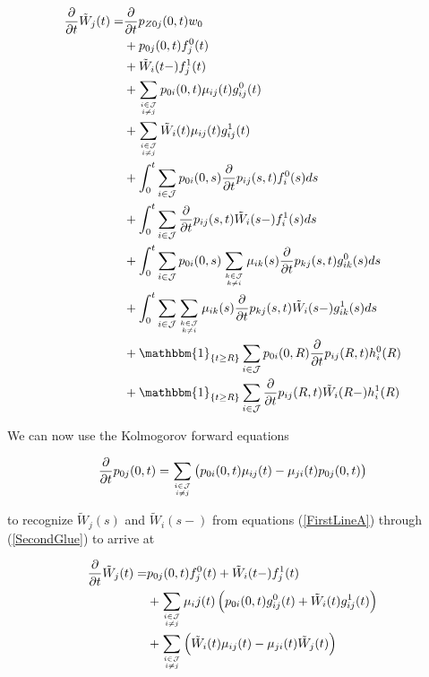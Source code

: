 \documentclass{article}
\newcommand{\1}[1]{\mathbbm{1}_{\left\lbrace #1 \right\rbrace}}
\theoremstyle{break}
\theoremstyle{remark}
\numberwithin{equation}{section}
\begin{document}
\begin{appendices}
\begin{align*}
\frac{\partial}{\partial t} \tilde{W}_j(t) =& \frac{\partial}{\partial t} p_{Z0j}(0,t) w_0 \\
&+ p_{0j}(0,t) f_j^0(t) \\
&+ \tilde{W}_i(t-) f_j^1(t) \\
&+ \sum_{i \in \mathcal{J} \atop i \neq j} p_{0i}(0,t) \mu_{ij}(t) g_{ij}^0(t) \\
&+ \sum_{i \in \mathcal{J} \atop i \neq j} \tilde{W}_i(t) \mu_{ij}(t) g_{ij}^1(t) \\
&+ \int_0^t \sum_{i \in \mathcal{J}} p_{0i}(0,s) \frac{\partial}{\partial t} p_{ij}(s,t) f_i^0(s) ds \\
&+ \int_0^t \sum_{i \in \mathcal{J}} \frac{\partial}{\partial t} p_{ij}(s,t) \tilde{W}_i(s-) f_i^1(s) ds \\
&+ \int_0^t \sum_{i \in \mathcal{J}} p_{0i}(0,s) \sum_{k \in \mathcal{J} \atop k \neq i} \mu_{ik}(s) \frac{\partial}{\partial t} p_{kj}(s,t) g_{ik}^0(s) ds \\
&+ \int_0^t \sum_{i \in \mathcal{J}} \sum_{k \in \mathcal{J} \atop k \neq i} \mu_{ik}(s) \frac{\partial}{\partial t} p_{kj}(s,t) \tilde{W}_i(s-) g_{ik}^1(s) ds \\
&+ \1{t \geq R}\sum_{i \in \mathcal{J}} p_{0i}(0,R) \frac{\partial}{\partial t} p_{ij}(R,t) h_i^0(R) \\
&+ \1{t \geq R}\sum_{i \in \mathcal{J}} \frac{\partial}{\partial t} p_{ij}(R,t) \tilde{W}_i(R-) h_i^1(R)
\end{align*}

We can now use the Kolmogorov forward equations

\begin{align*}
\frac{\partial}{\partial t} p_{0j}(0,t) = \sum_{i \in \mathcal{J} \atop i \neq j} \left( p_{0i}(0,t) \mu_{ij}(t) - \mu_{ji}(t) p_{0j}(0,t) \right)
\end{align*}

to recognize $\tilde{W}_j(s)$ and $\tilde{W}_i(s-)$ from equations (\ref{FirstLineA}) through (\ref{SecondGlue}) to arrive at

\begin{align*}
	\frac{\partial}{\partial t} \tilde{W}_j(t) =& p_{0j}(0,t) f_j^0(t) + \tilde{W}_i(t-) f_j^1(t) \\
	&+ \sum_{i \in \mathcal{J} \atop i \neq j} \mu_ij(t) \left( p_{0i}(0,t) g_{ij}^0(t) + \tilde{W}_i(t) g_{ij}^1(t) \right) \\
	&+ \sum_{i \in \mathcal{J} \atop i \neq j} \left( \tilde{W}_i(t) \mu_{ij}(t) - \mu_{ji}(t) \tilde{W}_j(t) \right)
\end{align*}


\end{appendices}
\end{document}
